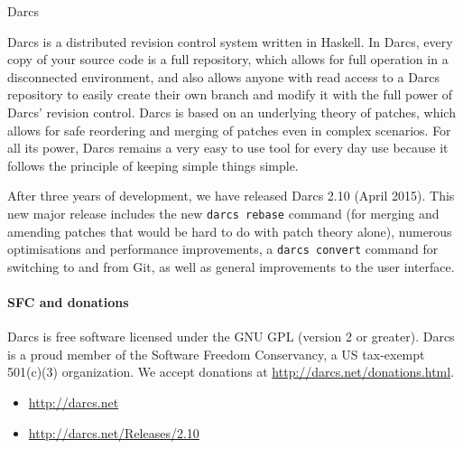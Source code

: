 \begin{hcarentry}[updated]{Darcs}
\label{darcs}
\makeheader

Darcs is a distributed revision control system written in Haskell. In
Darcs, every copy of your source code is a full repository, which allows for
full operation in a disconnected environment, and also allows anyone with
read access to a Darcs repository to easily create their own branch and
modify it with the full power of Darcs' revision control. Darcs is based on
an underlying theory of patches, which allows for safe reordering and
merging of patches even in complex scenarios. For all its power, Darcs
remains a very easy to use tool for every day use because it follows the
principle of keeping simple things simple.

After three years of development, we have released Darcs 2.10 (April
2015). This new major release includes the new \verb!darcs rebase!
command (for merging and amending patches that would be hard to do with
patch theory alone), numerous optimisations and performance
improvements, a \verb!darcs convert! command for switching to and from
Git, as well as general improvements to the user interface.

\paragraph{SFC and donations}

Darcs is free software licensed under the GNU GPL (version 2 or
greater).  Darcs is a proud
member of the Software Freedom Conservancy, a US tax-exempt 501(c)(3)
organization.  We accept donations at
\url{http://darcs.net/donations.html}.

\FurtherReading
\begin{itemize}
\item \url{http://darcs.net}
\item \url{http://darcs.net/Releases/2.10}
\end{itemize}
\end{hcarentry}
